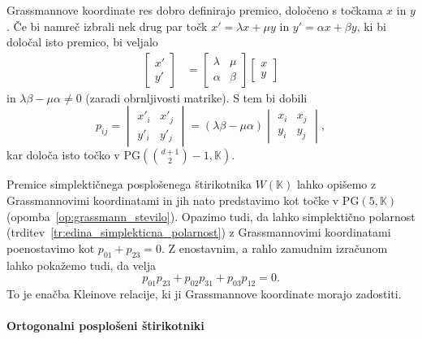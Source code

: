 \documentclass[fin1, tisk]{fmfdelo}
\newcommand{\PG}{\mathrm{PG}}
\begin{document}
\begin{opomba}
    Grassmannove koordinate res dobro definirajo premico, določeno s točkama $x$ in $y$.
    Če bi namreč izbrali nek drug par točk $x' = \lambda x + \mu y$ in $y' = \alpha x + \beta y$, 
    ki bi določal isto premico, bi veljalo
    \begin{align*}
        \begin{bmatrix}
            x' \\
            y'
        \end{bmatrix}
        &=
        \begin{bmatrix}
            \lambda & \mu \\
            \alpha & \beta
        \end{bmatrix}
        \begin{bmatrix}
            x \\
            y
        \end{bmatrix}
    \end{align*}
    in $\lambda\beta - \mu\alpha \neq 0$ (zaradi obrnljivosti matrike).
    S tem bi dobili $$p_{ij} = \begin{vmatrix} x'_i & x'_j \\ y'_i & y'_j \end{vmatrix} = (\lambda\beta - \mu\alpha) \begin{vmatrix} x_i & x_j \\ y_i & y_j \end{vmatrix},$$
    kar določa isto točko v $\PG\left(\binom{d+1}{2} - 1, \mathbb{K}\right)$.
\end{opomba}

\begin{zgled}\label{zg:grassmannove_koordinate}
    Premice simplektičnega posplošenega štirikotnika $W(\mathbb{K})$ lahko opišemo z Grassmannovimi koordinatami
    in jih nato predstavimo kot točke v $\PG(5, \mathbb{K})$ (opomba~\ref{op:grassmann_stevilo}). Opazimo tudi, da lahko 
    simplektično polarnost (trditev~\ref{tr:edina_simplekticna_polarnost}) z Grassmannovimi koordinatami 
    poenostavimo kot $p_{01} + p_{23} = 0$. Z enostavnim, a rahlo zamudnim izračunom lahko pokažemo tudi, da velja
    $$p_{01}p_{23} + p_{02}p_{31} + p_{03}p_{12} = 0.$$ 
    To je enačba Kleinove relacije, ki ji Grassmannove koordinate morajo zadostiti.
\end{zgled}

\paragraph{Ortogonalni posplošeni štirikotniki}
\end{document}
